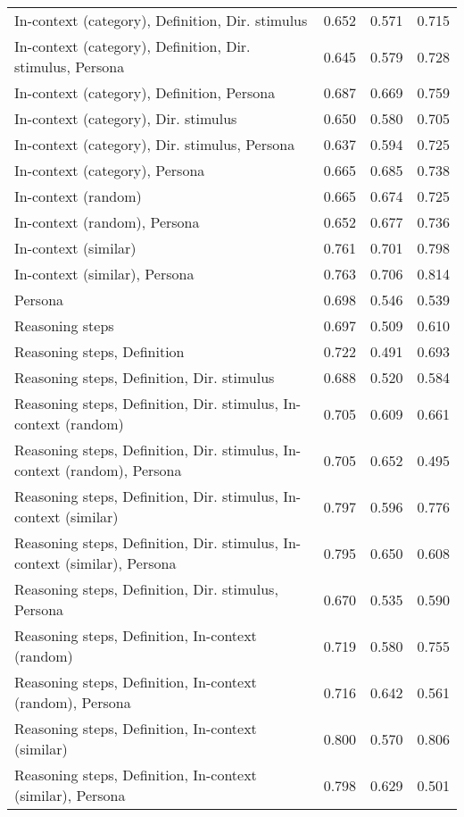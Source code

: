 \begin{table*}
\begin{tabular}{lrrr}
        In-context (category), Definition, Dir. stimulus & 0.652 & 0.571 & 0.715 \\
        In-context (category), Definition, Dir. stimulus, Persona & 0.645 & 0.579 & 0.728 \\
        In-context (category), Definition, Persona & 0.687 & 0.669 & 0.759 \\
        In-context (category), Dir. stimulus & 0.650 & 0.580 & 0.705 \\
        In-context (category), Dir. stimulus, Persona & 0.637 & 0.594 & 0.725 \\
        In-context (category), Persona & 0.665 & 0.685 & 0.738 \\
        In-context (random) & 0.665 & 0.674 & 0.725 \\
        In-context (random), Persona & 0.652 & 0.677 & 0.736 \\
        In-context (similar) & 0.761 & 0.701 & 0.798 \\
        In-context (similar), Persona & 0.763 & 0.706 & 0.814 \\
        Persona & 0.698 & 0.546 & 0.539 \\
        Reasoning steps & 0.697 & 0.509 & 0.610 \\
        Reasoning steps, Definition & 0.722 & 0.491 & 0.693 \\
        Reasoning steps, Definition, Dir. stimulus & 0.688 & 0.520 & 0.584 \\
        Reasoning steps, Definition, Dir. stimulus, In-context (random) & 0.705 & 0.609 & 0.661 \\
        Reasoning steps, Definition, Dir. stimulus, In-context (random), Persona & 0.705 & 0.652 & 0.495 \\
        Reasoning steps, Definition, Dir. stimulus, In-context (similar) & 0.797 & 0.596 & 0.776 \\
        Reasoning steps, Definition, Dir. stimulus, In-context (similar), Persona & 0.795 & 0.650 & 0.608 \\
        Reasoning steps, Definition, Dir. stimulus, Persona & 0.670 & 0.535 & 0.590 \\
        Reasoning steps, Definition, In-context (random) & 0.719 & 0.580 & 0.755 \\
        Reasoning steps, Definition, In-context (random), Persona & 0.716 & 0.642 & 0.561 \\
        Reasoning steps, Definition, In-context (similar) & 0.800 & 0.570 & 0.806 \\
        Reasoning steps, Definition, In-context (similar), Persona & 0.798 & 0.629 & 0.501 \\

\end{tabular}
\end{table*}

